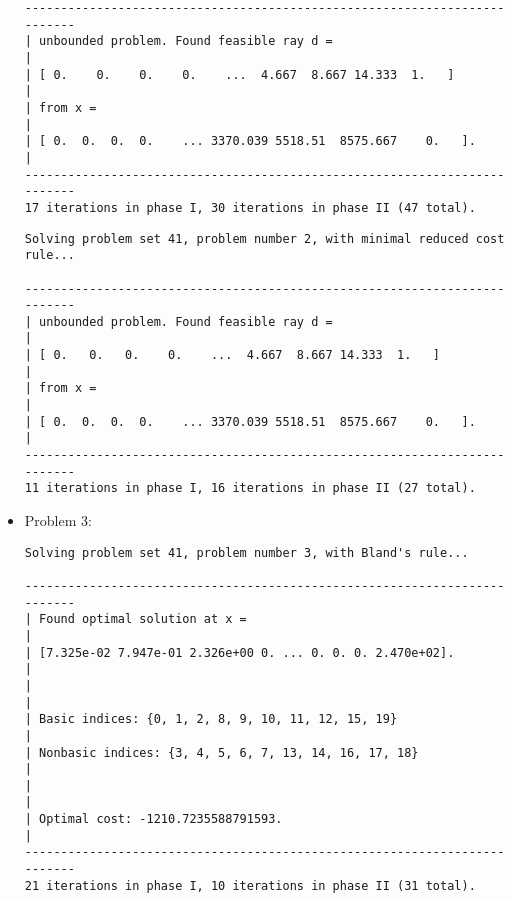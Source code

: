 \documentclass[a4paper]{article}
\begin{document}
\begin{itemize}
\begin{verbatim}
--------------------------------------------------------------------------
| unbounded problem. Found feasible ray d =                              |
| [ 0.    0.    0.    0.    ...  4.667  8.667 14.333  1.   ]             |
| from x =                                                               |
| [ 0.  0.  0.  0.    ... 3370.039 5518.51  8575.667    0.   ].          |
--------------------------------------------------------------------------
17 iterations in phase I, 30 iterations in phase II (47 total).

\end{verbatim}

\vspace{2ex}
\begin{verbatim}
Solving problem set 41, problem number 2, with minimal reduced cost rule...

--------------------------------------------------------------------------
| unbounded problem. Found feasible ray d =                              |
| [ 0.   0.   0.    0.    ...  4.667  8.667 14.333  1.   ]               |
| from x =                                                               |
| [ 0.  0.  0.  0.    ... 3370.039 5518.51  8575.667    0.   ].          |
--------------------------------------------------------------------------
11 iterations in phase I, 16 iterations in phase II (27 total).
\end{verbatim}

\vspace{2ex}
\item Problem 3:
\begin{verbatim}
Solving problem set 41, problem number 3, with Bland's rule...

--------------------------------------------------------------------------
| Found optimal solution at x =                                          |
| [7.325e-02 7.947e-01 2.326e+00 0. ... 0. 0. 0. 2.470e+02].             |
|                                                                        |
| Basic indices: {0, 1, 2, 8, 9, 10, 11, 12, 15, 19}                     |
| Nonbasic indices: {3, 4, 5, 6, 7, 13, 14, 16, 17, 18}                  |
|                                                                        |
| Optimal cost: -1210.7235588791593.                                     |
--------------------------------------------------------------------------
21 iterations in phase I, 10 iterations in phase II (31 total).
\end{verbatim}


\end{itemize}
\end{document}
